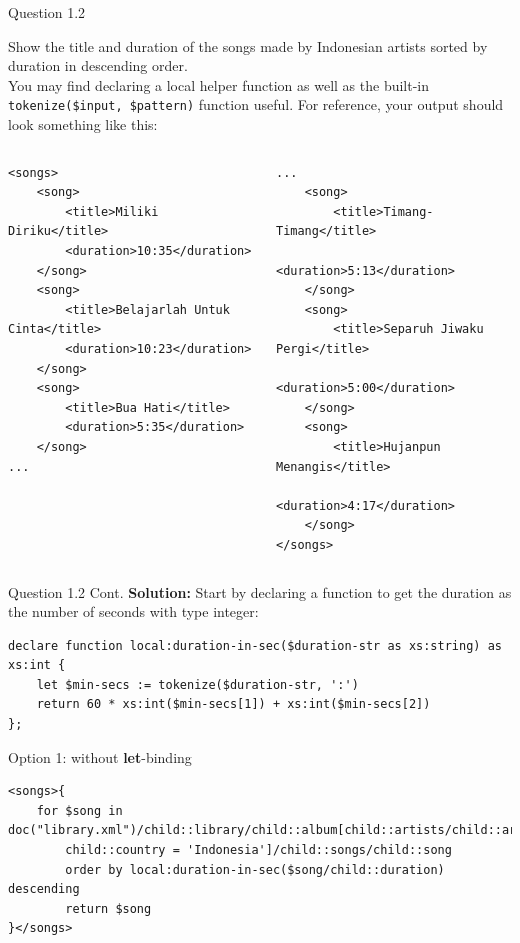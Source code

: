 \begin{frame}[fragile]{Question 1.2}
	
Show the title and duration of the songs made by Indonesian artists sorted by duration in descending order. \\\vspace{5pt}
You may find declaring a local helper function as well as the built-in \texttt{tokenize(\$input, \$pattern)} function useful. For reference, your output should look something like this:\\\vspace{5pt}
\begin{columns}
\begin{lstlisting}[style=xml-small-nomargin]
<songs>
	<song>
		<title>Miliki Diriku</title>
		<duration>10:35</duration>
	</song>
	<song>
		<title>Belajarlah Untuk Cinta</title>
		<duration>10:23</duration>
	</song>
	<song>
		<title>Bua Hati</title>
		<duration>5:35</duration>
	</song>
...
\end{lstlisting}
\begin{lstlisting}[style=xml-small-nomargin]
...	
	<song>
		<title>Timang-Timang</title>
		<duration>5:13</duration>
	</song>
	<song>
		<title>Separuh Jiwaku Pergi</title>
		<duration>5:00</duration>
	</song>
	<song>
		<title>Hujanpun Menangis</title>
		<duration>4:17</duration>
	</song>
</songs>
\end{lstlisting}
\end{columns}
\end{frame}

\begin{frame}[fragile]{Question 1.2 Cont.}
\textbf{Solution:} Start by declaring a function to get the duration as the number of seconds with type integer:\\\vspace{5pt}
\begin{lstlisting}[style=xml-small]
declare function local:duration-in-sec($duration-str as xs:string) as xs:int {
	let $min-secs := tokenize($duration-str, ':')
	return 60 * xs:int($min-secs[1]) + xs:int($min-secs[2])
};
\end{lstlisting}

Option 1: without \textbf{let}-binding\\\vspace{5pt}
\begin{lstlisting}[style=xml-small]
<songs>{
	for $song in doc("library.xml")/child::library/child::album[child::artists/child::artist/
		child::country = 'Indonesia']/child::songs/child::song
		order by local:duration-in-sec($song/child::duration) descending
		return $song
}</songs>
\end{lstlisting}

\end{frame}

